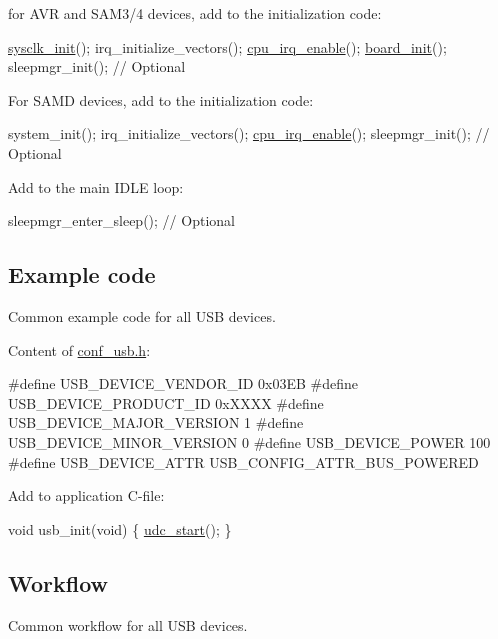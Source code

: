 for A\-V\-R and S\-A\-M3/4 devices, add to the initialization code\-: 
\begin{DoxyCode}
        \hyperlink{group__sysclk__group_ga242399e48a97739c88b4d0c00f6101de}{sysclk\_init}();
        irq\_initialize\_vectors();
        \hyperlink{group__interrupt__group_gae4922a4bd8ba4150211fbc7f2302403c}{cpu\_irq\_enable}();
        \hyperlink{group__group__common__boards_ga916f2adc2080b4fe88034086d107a8dc}{board\_init}();
        sleepmgr\_init(); \textcolor{comment}{// Optional}
\end{DoxyCode}


For S\-A\-M\-D devices, add to the initialization code\-: 
\begin{DoxyCode}
        system\_init();
        irq\_initialize\_vectors();
        \hyperlink{group__interrupt__group_gae4922a4bd8ba4150211fbc7f2302403c}{cpu\_irq\_enable}();
        sleepmgr\_init(); \textcolor{comment}{// Optional}
\end{DoxyCode}
 Add to the main I\-D\-L\-E loop\-: 
\begin{DoxyCode}
        sleepmgr\_enter\_sleep(); \textcolor{comment}{// Optional}
\end{DoxyCode}
  \hypertarget{udi_cdc_quickstart_udi_cdc_basic_use_case_setup_code}{}\subsection{Example code}\label{udi_cdc_quickstart_udi_cdc_basic_use_case_setup_code}
Common example code for all U\-S\-B devices.

Content of \hyperlink{conf__usb_8h}{conf\-\_\-usb.\-h}\-: 
\begin{DoxyCode}
\textcolor{preprocessor}{        #define USB\_DEVICE\_VENDOR\_ID 0x03EB}
\textcolor{preprocessor}{}\textcolor{preprocessor}{        #define USB\_DEVICE\_PRODUCT\_ID 0xXXXX}
\textcolor{preprocessor}{}\textcolor{preprocessor}{        #define USB\_DEVICE\_MAJOR\_VERSION 1}
\textcolor{preprocessor}{}\textcolor{preprocessor}{        #define USB\_DEVICE\_MINOR\_VERSION 0}
\textcolor{preprocessor}{}\textcolor{preprocessor}{        #define USB\_DEVICE\_POWER 100}
\textcolor{preprocessor}{        #define USB\_DEVICE\_ATTR USB\_CONFIG\_ATTR\_BUS\_POWERED}
\end{DoxyCode}


Add to application C-\/file\-: 
\begin{DoxyCode}
        \textcolor{keywordtype}{void} usb\_init(\textcolor{keywordtype}{void})
        \{
          \hyperlink{group__udc__group__interne_gadf4e193509cd03ab6333d62629ea51e7}{udc\_start}();
        \}
\end{DoxyCode}
  \hypertarget{udi_cdc_quickstart_udi_cdc_basic_use_case_setup_flow}{}\subsection{Workflow}\label{udi_cdc_quickstart_udi_cdc_basic_use_case_setup_flow}
Common workflow for all U\-S\-B devices.


